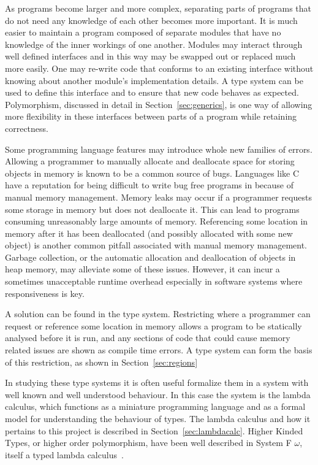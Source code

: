 As programs become larger and more complex, separating parts of programs that
do not need any knowledge of each other becomes more important. It is much
easier to maintain a program composed of separate modules that have no
knowledge of the inner workings of one another. Modules may interact through
well defined interfaces and in this way may be swapped out or replaced much
more easily. One may re-write code that conforms to an existing interface
without knowing about another module's implementation details. A type system can
be used to define this interface and to ensure that new code behaves as
expected. Polymorphism, discussed in detail in Section~\ref{sec:generics}, is
one way of allowing more flexibility in these interfaces between parts of a
program while retaining correctness.

Some programming language features may introduce whole new families of errors.
Allowing a programmer to manually allocate and deallocate space for storing
objects in memory is known to be a common source of bugs. Languages like C have
a reputation for being difficult to write bug free programs in because of
manual memory management. Memory leaks may occur if a programmer requests some
storage in memory but does not deallocate it. This can lead to programs
consuming unreasonably large amounts of memory. Referencing some location in
memory after it has been deallocated (and possibly allocated with some new
object) is another common pitfall associated with manual memory management.
Garbage collection, or the automatic allocation and deallocation of objects in
heap memory, may alleviate some of these issues.  However, it can incur a
sometimes unacceptable runtime overhead especially in software systems where
responsiveness is key.

A solution can be found in the type system. Restricting where a programmer can
request or reference some location in memory allows a program to be statically
analysed before it is run, and any sections of code that could cause memory
related issues are shown as compile time errors.  A type system can form the
basis of this restriction, as shown in Section~\ref{sec:regions}

In studying these type systems it is often useful formalize them in a system
with well known and well understood behaviour. In this case the system is the
lambda calculus, which functions as a miniature programming language and as a
formal model for understanding the behaviour of types. The lambda calculus and
how it pertains to this project is described in Section~\ref{sec:lambdacalc}.
Higher Kinded Types, or higher order polymorphism, have been well described in
System F $\omega$, itself a typed lambda calculus~\cite{tapl}.

